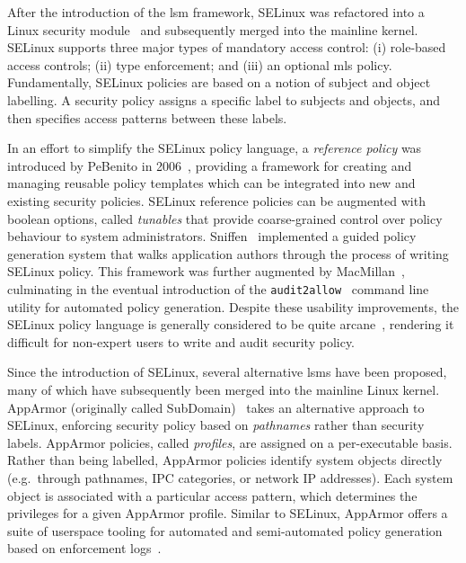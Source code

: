 After the introduction of the \gls{lsm} framework, SELinux was refactored into a Linux
security module~\cite{smalley2001_selinux} and subsequently merged into the mainline
kernel. SELinux supports three major types of mandatory access control: (i) role-based
access controls; (ii) type enforcement; and (iii) an optional \gls{mls} policy.
Fundamentally, SELinux policies are based on a notion of subject and object labelling.
A security policy assigns a specific label to subjects and objects, and then specifies
access patterns between these labels.

In an effort to simplify the SELinux policy language, a \textit{reference policy} was
introduced by PeBenito in 2006~\cite{pebenito2006_refpol}, providing a framework for
creating and managing reusable policy templates which can be integrated into new and
existing security policies. SELinux reference policies can be augmented with boolean
options, called \textit{tunables} that provide coarse-grained control over policy
behaviour to system administrators. Sniffen~\cite{sniffen06_guided} implemented a guided
policy generation system that walks application authors through the process of writing
SELinux policy. This framework was further augmented by
MacMillan~\cite{macmillan07_madison}, culminating in the eventual introduction of the
\texttt{audit2allow}~\cite{audit2allow} command line utility for automated policy
generation. Despite these usability improvements, the SELinux policy language is generally
considered to be quite arcane~\cite{schreuders2012_towards}, rendering it difficult for
non-expert users to write and audit security policy.

Since the introduction of SELinux, several alternative \gls{lsm}s have been proposed, many
of which have subsequently been merged into the mainline Linux kernel. AppArmor
(originally called SubDomain)~\cite{cowan2000_apparmor} takes an alternative approach to
SELinux, enforcing security policy based on \textit{pathnames} rather than security
labels.  AppArmor policies, called \textit{profiles}, are assigned on a per-executable
basis. Rather than being labelled, AppArmor policies identify system objects directly
(e.g.~through pathnames, IPC categories, or network IP addresses). Each system object is
associated with a particular access pattern, which determines the privileges for a given
AppArmor profile. Similar to SELinux, AppArmor offers a suite of userspace tooling for
automated and semi-automated policy generation based on enforcement
logs~\cite{aa_easyprof, aa_genprof, aa_logprof}.

